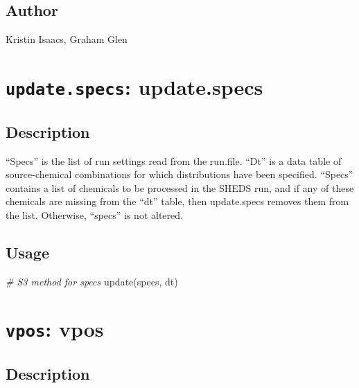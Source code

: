 \documentclass[
]{article}
\newenvironment{Shaded}{\begin{snugshade}}{\end{snugshade}}
\newcommand{\CommentTok}[1]{\textcolor[rgb]{0.56,0.35,0.01}{\textit{#1}}}
\newcommand{\FunctionTok}[1]{\textcolor[rgb]{0.00,0.00,0.00}{#1}}
\newcommand{\NormalTok}[1]{#1}
\begin{document}
\hypertarget{author-35}{%
\subsection{Author}\label{author-35}}

Kristin Isaacs, Graham Glen

\hypertarget{update.specs-update.specs}{%
\section{\texorpdfstring{\texttt{update.specs}:
update.specs}{update.specs: update.specs}}\label{update.specs-update.specs}}

\hypertarget{description-56}{%
\subsection{Description}\label{description-56}}

``Specs'' is the list of run settings read from the run.file. ``Dt'' is
a data table of source-chemical combinations for which distributions
have been specified. ``Specs'' contains a list of chemicals to be
processed in the SHEDS run, and if any of these chemicals are missing
from the ``dt'' table, then update.specs removes them from the list.
Otherwise, ``specs'' is not altered.

\hypertarget{usage-56}{%
\subsection{Usage}\label{usage-56}}

\begin{Shaded}
\begin{Highlighting}[]
\CommentTok{\# S3 method for specs}
\FunctionTok{update}\NormalTok{(specs, dt)}
\end{Highlighting}
\end{Shaded}

\hypertarget{vpos-vpos}{%
\section{\texorpdfstring{\texttt{vpos}:
vpos}{vpos: vpos}}\label{vpos-vpos}}

\hypertarget{description-57}{%
\subsection{Description}\label{description-57}}
\end{document}
